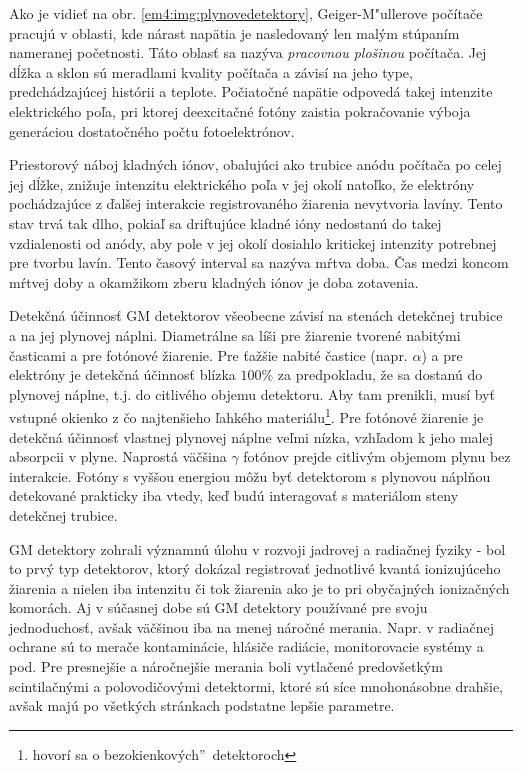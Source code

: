 \documentclass[../../main.tex]{subfiles}
\begin{document}
Ako je vidieť na obr. \ref{em4:img:plynovedetektory}, Geiger-M"ullerove počítače pracujú v oblasti, kde nárast napätia je nasledovaný len malým stúpaním nameranej početnosti. Táto oblasť sa nazýva \textit{pracovnou plošinou} počítača. Jej dĺžka a sklon sú meradlami kvality počítača a závisí na jeho type, predchádzajúcej histórii a teplote. Počiatočné napätie odpovedá takej intenzite elektrického poľa, pri ktorej deexcitačné fotóny zaistia pokračovanie výboja generáciou dostatočného počtu fotoelektrónov.

Priestorový náboj kladných iónov, obalujúci ako trubice anódu počítača po celej jej dĺžke, znižuje intenzitu elektrického poľa v jej okolí natoľko, že elektróny pochádzajúce z ďalšej interakcie registrovaného žiarenia nevytvoria lavíny. Tento stav trvá tak dlho, pokiaľ sa driftujúce kladné ióny nedostanú do takej vzdialenosti od anódy, aby pole v jej okolí dosiahlo kritickej intenzity potrebnej pre tvorbu lavín. Tento časový interval sa nazýva mŕtva doba. Čas medzi koncom mŕtvej doby a okamžikom zberu kladných iónov je doba zotavenia.

Detekčná účinnosť GM detektorov všeobecne závisí na stenách detekčnej trubice a na jej plynovej náplni. Diametrálne sa líši pre žiarenie tvorené nabitými časticami a pre fotónové žiarenie. Pre ťažšie nabité častice (napr. $\alpha$) a pre elektróny je detekčná účinnosť blízka $100\%$ za predpokladu, že sa dostanú do plynovej náplne, t.j. do citlivého objemu detektoru. Aby tam prenikli, musí byť vstupné okienko z čo najtenšieho ľahkého materiálu\footnote{hovorí sa o \quotedblbase bezokienkových\textquotedblright ~detektoroch}. Pre fotónové žiarenie je detekčná účinnosť vlastnej plynovej náplne veľmi nízka, vzhľadom k jeho malej absorpcii v plyne. Naprostá väčšina $\gamma$ fotónov prejde citlivým objemom plynu bez interakcie. Fotóny s vyššou energiou môžu byť detektorom s plynovou náplňou detekované prakticky iba vtedy, keď budú interagovať s materiálom steny detekčnej trubice.

GM detektory zohrali významnú úlohu v rozvoji jadrovej a radiačnej fyziky - bol to prvý typ detektorov, ktorý dokázal registrovať jednotlivé kvantá ionizujúceho žiarenia a nielen iba intenzitu či tok žiarenia ako je to pri obyčajných ionizačných komorách. Aj v súčasnej dobe sú GM detektory používané pre svoju jednoduchosť, avšak väčšinou iba na menej náročné merania. Napr. v radiačnej ochrane sú to merače kontaminácie, hlásiče radiácie, monitorovacie systémy a pod. Pre presnejšie a náročnejšie merania boli vytlačené predovšetkým scintilačnými a polovodičovými detektormi, ktoré sú síce mnohonásobne drahšie, avšak majú po všetkých stránkach podstatne lepšie parametre.
\end{document}
